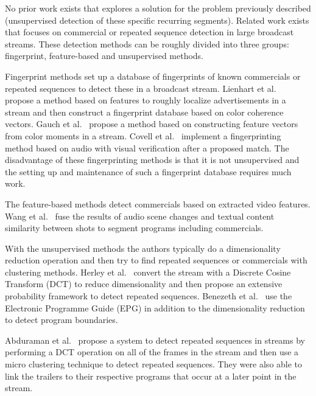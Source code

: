 \documentclass{article}
\begin{document}
No prior work exists that explores a solution for the problem previously described (unsupervised detection of these specific recurring segments). Related work exists that focuses on commercial or repeated sequence detection in large broadcast streams. These detection methods can be roughly divided into three groups: fingerprint, feature-based and unsupervised methods. 

Fingerprint methods set up a database of fingerprints of known commercials or repeated sequences to detect these in a broadcast stream. Lienhart et al.\ \cite{lienhart1997detection} propose a method based on features to roughly localize advertisements in a stream and then construct a fingerprint database based on color coherence vectors. Gauch et al.\ \cite{gauch2006finding} propose a method based on constructing feature vectors from color moments in a stream. Covell et al.\ \cite{covell2006advertisement} implement a fingerprinting method based on audio with visual verification after a proposed match. The disadvantage of these fingerprinting methods is that it is not unsupervised and the setting up and maintenance of such a fingerprint database requires much work.


The feature-based methods detect commercials based on extracted video features. Wang et al.\ \cite{wang2008multimodal} fuse the results of audio scene changes and textual content similarity between shots to segment programs including commercials.

With the unsupervised methods the authors typically do a dimensionality reduction operation and then try to find repeated sequences or commercials with clustering methods. Herley et al.\ \cite{herley2006argos} convert the stream with a Discrete Cosine Transform (DCT) to reduce dimensionality and then propose an extensive probability framework to detect repeated sequences. Benezeth et al.\ \cite{benezeth2010unsupervised} use the Electronic Programme Guide (EPG) in addition to the dimensionality reduction to detect program boundaries.

Abduraman et al.\ \cite{abduraman2011unsupervised} propose a system to detect repeated sequences in streams by performing a DCT operation on all of the frames in the stream and then use a micro clustering technique to detect repeated sequences. They were also able to link the trailers to their respective programs that occur at a later point in the stream.
\end{document}
